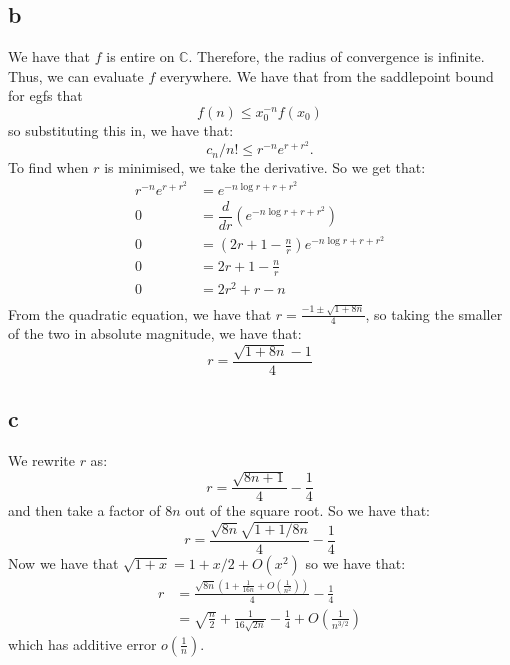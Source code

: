 \documentclass[]{article}
\begin{document}
\subsection{b}
We have that $f$ is entire on $\mathbb{C}$. Therefore, the radius of convergence is infinite. Thus, we can evaluate $f$ everywhere. We have that from the saddlepoint bound for egfs that
\begin{equation}
	[x^n] f(n) \leq x_0^{-n} f(x_0)
\end{equation}
so substituting this in, we have that:
\begin{equation}
	c_n/n! \leq r^{-n} e^{r + r^2}.
\end{equation}
To find when $r$ is minimised, we take the derivative. So we get that:
\begin{align*}
	 r^{-n} e^{r + r^2} &= e^{-n \log r + r + r^2}\\
	 0 &= \dfrac{d}{dr}(e^{-n \log r + r + r^2}) \\
	 0 &= \left(2r + 1 - \frac{n}{r}\right) e^{-n \log r + r + r^2}\\
	 0 &= 2r + 1 - \frac{n}{r}\\
	 0 &= 2r^2 + r - n\\
\end{align*}
From the quadratic equation, we have that $r = \frac{-1 \pm \sqrt{1 + 8n}}{4}$, so taking the smaller of the two in absolute magnitude, we have that:
\begin{equation}
	r = \frac{\sqrt{1 + 8n} - 1}{4}
\end{equation}

\subsection{c}
We rewrite $r$ as:
\begin{equation}
	r = \frac{\sqrt{8n + 1}}{4} - \frac{1}{4}
\end{equation}
and then take a factor of $8n$ out of the square root. So we have that:
\begin{equation}
	r = \frac{\sqrt{8n}\sqrt{1+ 1/8n}}{4} - \frac{1}{4}
\end{equation}
Now we have that $\sqrt{1 + x} = 1 + x/2 + O(x^2)$ so we have that:
\begin{align*}
	r &= \frac{\sqrt{8n}\left(1 + \frac{1}{16n} + O(\frac{1}{n^2})\right)}{4} - \frac{1}{4}\\
	&= \sqrt{\frac{n}{2}} + \frac{1}{16 \sqrt{2 n}} - \frac{1}{4} + O(\frac{1}{n^{3/2}})
\end{align*}
which has additive error $o(\frac{1}{n})$. 
\end{document}
